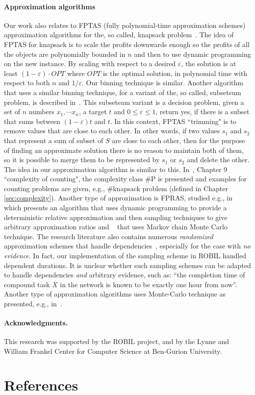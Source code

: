 \documentclass[review]{elsarticle}
\begin{document}
\paragraph{Approximation algorithms} Our work also relates to FPTAS (fully polynomial-time approximation schemes)~\cite{arora2009computational} approximation algorithms for the, so called, knapsack problem~\cite{lai2006knapsack, lawler1979fast,gopalan2011fptas}. The idea of  FPTAS for knapsack is to scale the profits downwards enough so the profits of all the objects are polynomially bounded in $n$ and then to use dynamic programming on the new instance. By scaling with respect to a desired $\varepsilon$, the solution is at least $(1-\varepsilon)\cdot OPT$ where $OPT$ is the optimal solution, in polynomial time with respect to both $n$ and $1/\varepsilon$. Our binning technique is similar. Another algorithm that uses a similar binning technique, for a variant of the, so called, subsetsum problem, is described in~\cite{Cormen:2001:IA:580470}. This subsetsum variant is a decision problem, given a set of $n$ numbers $x_1, \cdots x_n$, a target $t$ and $0\leq\varepsilon\leq 1$, return yes, if there is a subset that sums between $(1 - \varepsilon)t$ and $t$. In this context, FPTAS ``trimming" is to remove values that are close to each other. In other words, if two values $s_1$ and $s_2$ that represent a sum of subset of $S$ are close to each other, then for the purpose of finding an approximate solution there is no reason to maintain both of them, so it is possible to merge them to be represented by $s_1$ or $s_2$ and delete the other. The idea in our approximation algorithm is similar to this. In~\cite{arora2009computational}, Chapter 9  ``complexity of counting", the complexity class \#P is presented and examples for counting problems are given, e.g., \#knapsack problem (defined in Chapter \ref{sec:complexity}). Another type of approximation is FPRAS, studied e.g., in~\cite{dyer2003approximate} which presents an algorithm that uses dynamic programming to provide a deterministic relative approximation and then sampling techniques to give arbitrary approximation ratios  and ~\cite{morris2004random}  that uses Markov chain Monte Carlo technique. The research literature also contains numerous {\em randomized} approximation schemes that handle dependencies~\cite{Pearl,Yuan20061189}, especially for
the case with {\em no evidence}. In fact, our implementation of the sampling scheme in ROBIL handled dependent durations.
It is unclear whether such sampling schemes can be adapted to handle dependencies {\em and} arbitrary evidence, such as: ``the completion time of
compound task $X$ in the network is known to be exactly one hour from now''. Another type of approximation algorithms uses Monte-Carlo technique as presented, e.g., in~\cite{bucher1988adaptive,lipton1990practical}. 

\paragraph{Acknowledgments.} This research was supported by the ROBIL project, and by the Lynne and William Frankel Center for Computer Science at Ben-Gurion University.

\section*{References}

\end{document}
